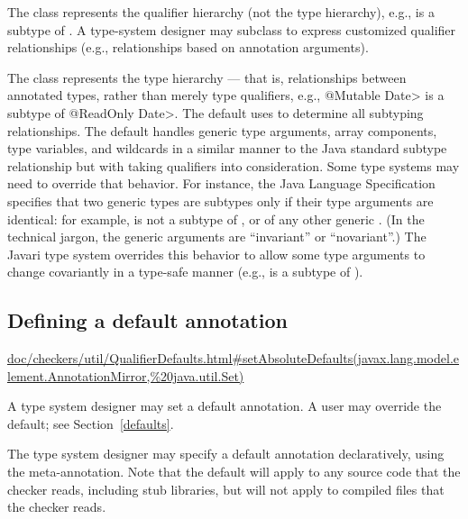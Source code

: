 The  class represents the qualifier hierarchy (not the
type hierarchy), e.g., 
is a subtype of .  A type-system designer may subclass
 to express customized qualifier
relationships (e.g., relationships based on annotation
arguments).

The  class represents the type hierarchy ---
that is, relationships between
annotated types, rather than merely type qualifiers, e.g., \<@Mutable
Date> is a subtype of \<@ReadOnly Date>.  The default  uses
 to determine all subtyping relationships.
The default  handles
generic type arguments, array components, type variables, and
wildcards in a similar manner to the Java standard subtype
relationship but with taking qualifiers into consideration.  Some type
systems may need to override that behavior.  For instance, the Java
Language Specification specifies that two generic types are subtypes only
if their type arguments are identical:  for example,
 is not a subtype of , or of any other
generic .
(In the technical jargon, the generic arguments are ``invariant'' or ``novariant''.)
The Javari type system overrides this
behavior to allow some type arguments to change covariantly in a type-safe
manner (e.g.,
 is a subtype of ).


\subsection{Defining a default annotation\label{typesystem-defaults}}


\urldef{\setAbsoluteDefaultsURL}\url{doc/checkers/util/QualifierDefaults.html#setAbsoluteDefaults(javax.lang.model.element.AnnotationMirror,%20java.util.Set)}

A type system designer may set a default annotation.  A user may override
the default; see Section~\ref{defaults}.

The type system designer may specify a default annotation declaratively,
using the 
meta-annotation.
Note that the default will apply to any source code that the checker reads,
including stub libraries, but will not apply to compiled 
files that the checker reads.

